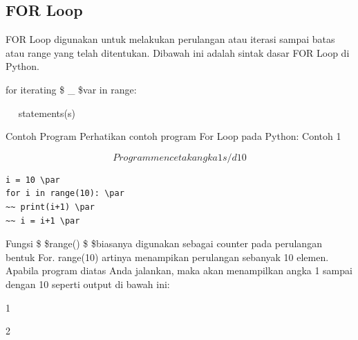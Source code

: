 \subsection{FOR Loop}
FOR Loop digunakan untuk melakukan perulangan atau iterasi sampai batas atau range yang telah ditentukan.\vspace{\baselineskip}
\vspace{\baselineskip}
Dibawah ini adalah sintak dasar FOR Loop di Python.\vspace{\baselineskip}
\vspace{\baselineskip}
 \par
for iterating \$  \_  \$var in range: \par
~~ statements(s) \par
\vspace{\baselineskip}
Contoh Program\vspace{\baselineskip}
\vspace{\baselineskip}
Perhatikan contoh program For Loop pada Python:\vspace{\baselineskip}
\vspace{\baselineskip}
Contoh 1\vspace{\baselineskip}
\vspace{\baselineskip}
 \par
 \begin{equation}
 Program mencetak angka 1 s/d 10 
 \end{equation}
\vspace{12pt}
\begin{verbatim}
i = 10 \par
for i in range(10): \par
~~ print(i+1) \par
~~ i = i+1 \par
\end{verbatim}
\vspace{\baselineskip}
Fungsi \$  \$range() \$  \$biasanya digunakan sebagai counter pada perulangan bentuk For. range(10) artinya menampikan perulangan sebanyak 10 elemen.\vspace{\baselineskip}
\vspace{\baselineskip}
Apabila program diatas Anda jalankan, maka akan menampilkan angka 1 sampai dengan 10 seperti output di bawah ini:\vspace{\baselineskip}
\vspace{\baselineskip}
 \par
1 \par
2 \par
